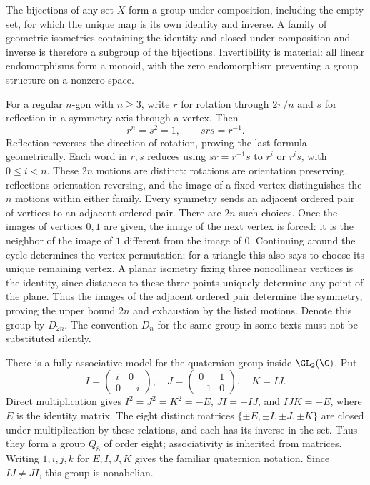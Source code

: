 The bijections of any set $X$ form a group under composition, including the empty set, for which the unique map is its own identity and inverse. A family of geometric isometries containing the identity and closed under composition and inverse is therefore a subgroup of the bijections. Invertibility is material: all linear endomorphisms form a monoid, with the zero endomorphism preventing a group structure on a nonzero space.

For a regular $n$-gon with $n\geq3$, write $r$ for rotation through $2\pi/n$ and $s$ for reflection in a symmetry axis through a vertex. Then
\[
 r^n=s^2=1,\qquad srs=r^{-1}.
\]
Reflection reverses the direction of rotation, proving the last formula geometrically. Each word in $r,s$ reduces using $sr=r^{-1}s$ to $r^i$ or $r^is$, with $0\leq i<n$. These $2n$ motions are distinct: rotations are orientation preserving, reflections orientation reversing, and the image of a fixed vertex distinguishes the $n$ motions within either family. Every symmetry sends an adjacent ordered pair of vertices to an adjacent ordered pair. There are $2n$ such choices. Once the images of vertices $0,1$ are given, the image of the next vertex is forced: it is the neighbor of the image of $1$ different from the image of $0$. Continuing around the cycle determines the vertex permutation; for a triangle this also says to choose its unique remaining vertex. A planar isometry fixing three noncollinear vertices is the identity, since distances to these three points uniquely determine any point of the plane. Thus the images of the adjacent ordered pair determine the symmetry, proving the upper bound $2n$ and exhaustion by the listed motions. Denote this group by $D_{2n}$. The convention $D_n$ for the same group in some texts must not be substituted silently.

There is a fully associative model for the quaternion group inside $\GL_2(\C)$. Put
\[
 I=\begin{pmatrix}i&0\\0&-i\end{pmatrix},\quad
 J=\begin{pmatrix}0&1\\-1&0\end{pmatrix},\quad K=IJ.
\]
Direct multiplication gives $I^2=J^2=K^2=-E$, $JI=-IJ$, and $IJK=-E$, where $E$ is the identity matrix. The eight distinct matrices $\{\pm E,\pm I,\pm J,\pm K\}$ are closed under multiplication by these relations, and each has its inverse in the set. Thus they form a group $Q_8$ of order eight; associativity is inherited from matrices. Writing $1,i,j,k$ for $E,I,J,K$ gives the familiar quaternion notation. Since $IJ\ne JI$, this group is nonabelian.

